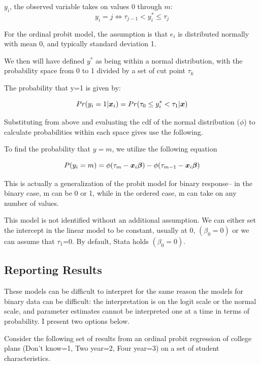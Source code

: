 \documentclass[12 pt]{article}
\begin{document}
$y_i$, the observed variable takes on values $0$ through $m$:
\begin{equation*}
  y_i=j \iff \tau_{j-1}< y^*_i \leq \tau_{j} 
\end{equation*}

For the ordinal probit model, the assumption is that $e_i$ is
distributed normally with mean 0, and typically standard deviation 1. 

We then will have defined $y^*$ as being within a normal distribution,
with the probability space from 0 to 1 divided by a set of cut point $\tau_k$

The probability that y=1 is given by:

\begin{equation*}
  Pr(y_i=1| \boldsymbol{x}_i)=Pr(\tau_0\leq y_i^* < \tau_1|\boldsymbol{x})
\end{equation*}

Substituting from above and evaluating the cdf of the normal
distribution ($\phi$) to calculate probabilities within each space
gives use the following. 

To find the probability that $y=m$, we utilize the following equation

\begin{equation*}
  P(y_i=m)=\phi(\tau_m-\boldsymbol{x}_i\boldsymbol{\beta})-\phi(\tau_{m-1}-\boldsymbol{x}_i\boldsymbol{\beta})
\end{equation*}

This is actually a generalization of the probit model for binary
response-- in the binary case, m can be 0 or 1, while in the ordered
case, m can take on any number of values. 

This model is not identified without an additional assumption. We can
either set the intercept in the linear model to be constant, usually
at 0,  $(\beta_0=0)$ or we can assume
that $\tau_1$=0. By default, Stata holds $(\beta_0=0)$. 

\subsection{Reporting Results}
\label{sec:reporting-results}

These models can be difficult to interpret for the same reason the
models for binary data can be difficult: the interpretation is on the
logit scale or the normal scale, and parameter estimates cannot be
interpreted one at a time in terms of probability. I present two
options below. 

Consider the following set of results from an ordinal probit
regression of college plans (Don't know=1, Two year=2, Four year=3) on
a set of student characteristics. 
\end{document}
